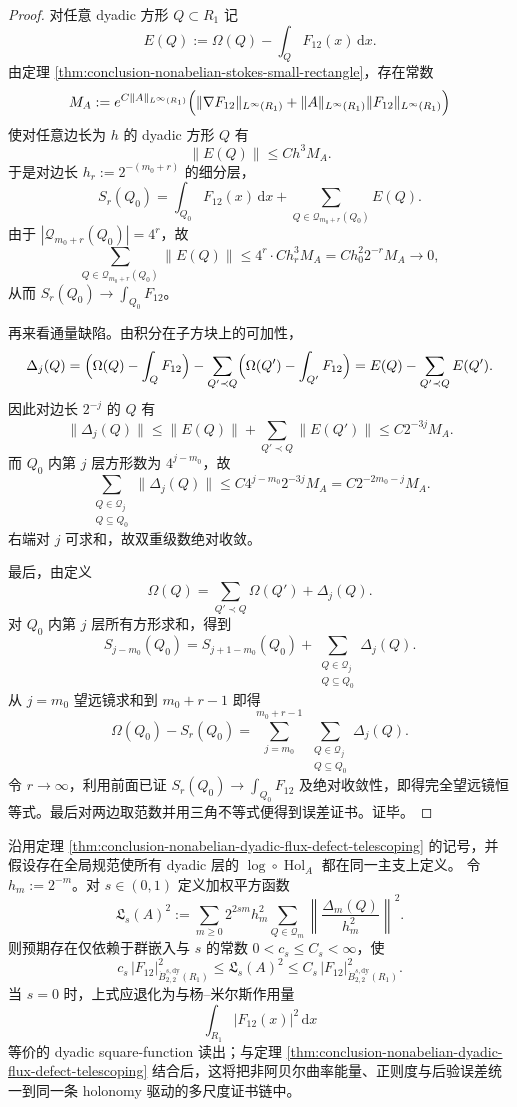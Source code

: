 \begin{proof}
对任意 dyadic 方形 \(Q\subset R_1\) 记
\[
E(Q):=\Omega(Q)-\int_Q F_{12}(x)\,\mathrm d x.
\]
由定理 \ref{thm:conclusion-nonabelian-stokes-small-rectangle}，存在常数
\[
M_A
:=
e^{C\|A\|_{L^\infty(R_1)}}
\Bigl(
\|\nabla F_{12}\|_{L^\infty(R_1)}
+\|A\|_{L^\infty(R_1)}\|F_{12}\|_{L^\infty(R_1)}
\Bigr)
\]
使对任意边长为 \(h\) 的 dyadic 方形 \(Q\) 有
\[
\|E(Q)\|\le C h^3 M_A.
\]
于是对边长 \(h_r:=2^{-(m_0+r)}\) 的细分层，
\[
S_r(Q_0)
=
\int_{Q_0}F_{12}(x)\,\mathrm d x
+\sum_{Q\in\mathcal Q_{m_0+r}(Q_0)}E(Q).
\]
由于 \(|\mathcal Q_{m_0+r}(Q_0)|=4^r\)，故
\[
\sum_{Q\in\mathcal Q_{m_0+r}(Q_0)}\|E(Q)\|
\le
4^r\cdot C h_r^3 M_A
=
C h_0^2 2^{-r} M_A\longrightarrow 0,
\]
从而 \(S_r(Q_0)\to \int_{Q_0}F_{12}\)。

再来看通量缺陷。由积分在子方块上的可加性，
\[
\Delta_j(Q)
=
\Bigl(\Omega(Q)-\int_Q F_{12}\Bigr)
-\sum_{Q'\prec Q}\Bigl(\Omega(Q')-\int_{Q'}F_{12}\Bigr)
=
E(Q)-\sum_{Q'\prec Q}E(Q').
\]
因此对边长 \(2^{-j}\) 的 \(Q\) 有
\[
\|\Delta_j(Q)\|
\le
\|E(Q)\|+\sum_{Q'\prec Q}\|E(Q')\|
\le
C 2^{-3j}M_A.
\]
而 \(Q_0\) 内第 \(j\) 层方形数为 \(4^{j-m_0}\)，故
\[
\sum_{\substack{Q\in\mathcal Q_j\\ Q\subseteq Q_0}}\|\Delta_j(Q)\|
\le
C 4^{j-m_0}2^{-3j}M_A
=
C 2^{-2m_0-j}M_A.
\]
右端对 \(j\) 可求和，故双重级数绝对收敛。

最后，由定义
\[
\Omega(Q)=\sum_{Q'\prec Q}\Omega(Q')+\Delta_j(Q).
\]
对 \(Q_0\) 内第 \(j\) 层所有方形求和，得到
\[
S_{j-m_0}(Q_0)
=
S_{j+1-m_0}(Q_0)
+\sum_{\substack{Q\in\mathcal Q_j\\ Q\subseteq Q_0}}\Delta_j(Q).
\]
从 \(j=m_0\) 望远镜求和到 \(m_0+r-1\) 即得
\[
\Omega(Q_0)-S_r(Q_0)
=
\sum_{j=m_0}^{m_0+r-1}\ \sum_{\substack{Q\in\mathcal Q_j\\ Q\subseteq Q_0}}\Delta_j(Q).
\]
令 \(r\to\infty\)，利用前面已证 \(S_r(Q_0)\to \int_{Q_0}F_{12}\) 及绝对收敛性，即得完全望远镜恒等式。最后对两边取范数并用三角不等式便得到误差证书。证毕。
\end{proof}

\begin{conjecture}\label{conj:conclusion-nonabelian-dyadic-littlewood-paley}
沿用定理 \ref{thm:conclusion-nonabelian-dyadic-flux-defect-telescoping} 的记号，并假设存在全局规范使所有 dyadic 层的 \(\log\circ \operatorname{Hol}_A\) 都在同一主支上定义。
令 \(h_m:=2^{-m}\)。对 \(s\in(0,1)\) 定义加权平方函数
\[
\mathfrak L_s(A)^2
:=
\sum_{m\ge 0}
2^{2sm} h_m^2
\sum_{Q\in\mathcal Q_m}
\left\|
\frac{\Delta_m(Q)}{h_m^2}
\right\|^2.
\]
则预期存在仅依赖于群嵌入与 \(s\) 的常数 \(0<c_s\le C_s<\infty\)，使
\[
c_s\,|F_{12}|_{\dot B_{2,2}^{s,\mathrm{dy}}(R_1)}^2
\le
\mathfrak L_s(A)^2
\le
C_s\,|F_{12}|_{\dot B_{2,2}^{s,\mathrm{dy}}(R_1)}^2.
\]
当 \(s=0\) 时，上式应退化为与杨--米尔斯作用量
\[
\int_{R_1}|F_{12}(x)|^2\,\mathrm d x
\]
等价的 dyadic square-function 读出；与定理 \ref{thm:conclusion-nonabelian-dyadic-flux-defect-telescoping} 结合后，这将把非阿贝尔曲率能量、正则度与后验误差统一到同一条 holonomy 驱动的多尺度证书链中。
\end{conjecture}

\endinput
